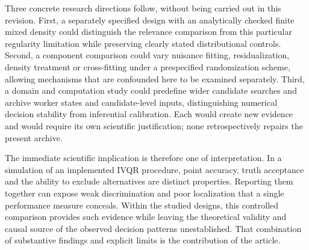 Three concrete research directions follow, without being carried out in this revision. First, a separately specified design with an analytically checked finite mixed density could distinguish the relevance comparison from this particular regularity limitation while preserving clearly stated distributional controls. Second, a component comparison could vary nuisance fitting, residualization, density treatment or cross-fitting under a prespecified randomization scheme, allowing mechanisms that are confounded here to be examined separately. Third, a domain and computation study could predefine wider candidate searches and archive worker states and candidate-level inputs, distinguishing numerical decision stability from inferential calibration. Each would create new evidence and would require its own scientific justification; none retrospectively repairs the present archive.

The immediate scientific implication is therefore one of interpretation. In a simulation of an implemented IVQR procedure, point accuracy, truth acceptance and the ability to exclude alternatives are distinct properties. Reporting them together can expose weak discrimination and poor localization that a single performance measure conceals. Within the studied designs, this controlled comparison provides such evidence while leaving the theoretical validity and causal source of the observed decision patterns unestablished. That combination of substantive findings and explicit limits is the contribution of the article.
